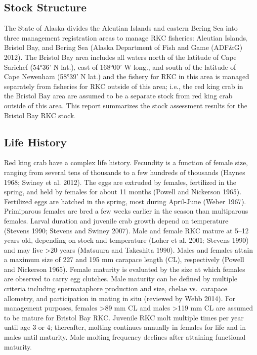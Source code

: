 \documentclass[]{article}
\begin{document}
\subsection{Stock Structure}\label{stock-structure}

The State of Alaska divides the Aleutian Islands and eastern Bering Sea
into three management registration areas to manage RKC fisheries:
Aleutian Islands, Bristol Bay, and Bering Sea (Alaska Department of Fish
and Game (ADF\&G) 2012). The Bristol Bay area includes all waters north
of the latitude of Cape Sarichef (54°36' N lat.), east of 168°00' W
long., and south of the latitude of Cape Newenham (58°39' N lat.) and
the fishery for RKC in this area is managed separately from fisheries
for RKC outside of this area; i.e., the red king crab in the Bristol Bay
area are assumed to be a separate stock from red king crab outside of
this area. This report summarizes the stock assessment results for the
Bristol Bay RKC stock.

\subsection{Life History}\label{life-history}

Red king crab have a complex life history. Fecundity is a function of
female size, ranging from several tens of thousands to a few hundreds of
thousands (Haynes 1968; Swiney et al. 2012). The eggs are extruded by
females, fertilized in the spring, and held by females for about 11
months (Powell and Nickerson 1965). Fertilized eggs are hatched in the
spring, most during April-June (Weber 1967). Primiparous females are
bred a few weeks earlier in the season than multiparous females. Larval
duration and juvenile crab growth depend on temperature (Stevens 1990;
Stevens and Swiney 2007). Male and female RKC mature at 5--12 years old,
depending on stock and temperature (Loher et al. 2001; Stevens 1990) and
may live \textgreater{}20 years (Matsuura and Takeshita 1990). Males and
females attain a maximum size of 227 and 195 mm carapace length (CL),
respectively (Powell and Nickerson 1965). Female maturity is evaluated
by the size at which females are observed to carry egg clutches. Male
maturity can be defined by multiple criteria including spermataphore
production and size, chelae vs.~carapace allometry, and participation in
mating in situ (reviewed by Webb 2014). For management purposes, females
\textgreater{}89 mm CL and males \textgreater{}119 mm CL are assumed to
be mature for Bristol Bay RKC. Juvenile RKC molt multiple times per year
until age 3 or 4; thereafter, molting continues annually in females for
life and in males until maturity. Male molting frequency declines after
attaining functional maturity.
\end{document}
